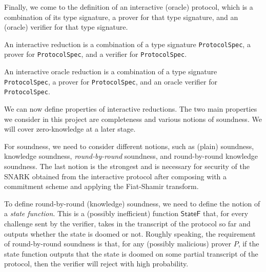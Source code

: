 Finally, we come to the definition of an interactive (oracle) protocol, which is a combination of its type signature, a prover for that type signature, and an (oracle) verifier for that type signature.

\begin{definition}
    \label{def:interactive_reduction}
    An interactive reduction is a combination of a type signature \verb|ProtocolSpec|, a prover for \verb|ProtocolSpec|, and a verifier for \verb|ProtocolSpec|.
\end{definition}

\begin{definition}
    \label{def:interactive_oracle_reduction}
    An interactive oracle reduction is a combination of a type signature \verb|ProtocolSpec|, a prover for \verb|ProtocolSpec|, and an oracle verifier for \verb|ProtocolSpec|.
\end{definition}

We can now define properties of interactive reductions. The two main properties we consider in this project are completeness and various notions of soundness. We will cover zero-knowledge at a later stage.

\begin{definition}[Completeness]
    \label{def:completeness}
\end{definition}

For soundness, we need to consider different notions, such as (plain) soundness, knowledge soundness, \emph{round-by-round} soundness, and round-by-round knowledge soundness. The last notion is the strongest and is necessary for security of the SNARK obtained from the interactive protocol after composing with a commitment scheme and applying the Fiat-Shamir transform.

\begin{definition}[Soundness]
    \label{def:soundness}
\end{definition}

\begin{definition}
    \label{def:knowledge_soundness}
\end{definition}

To define round-by-round (knowledge) soundness, we need to define the notion of a \emph{state function}. This is a (possibly inefficient) function $\mathsf{StateF}$ that, for every challenge sent by the verifier, takes in the transcript of the protocol so far and outputs whether the state is doomed or not. Roughly speaking, the requirement of round-by-round soundness is that, for any (possibly malicious) prover $P$, if the state function outputs that the state is doomed on some partial transcript of the protocol, then the verifier will reject with high probability.

